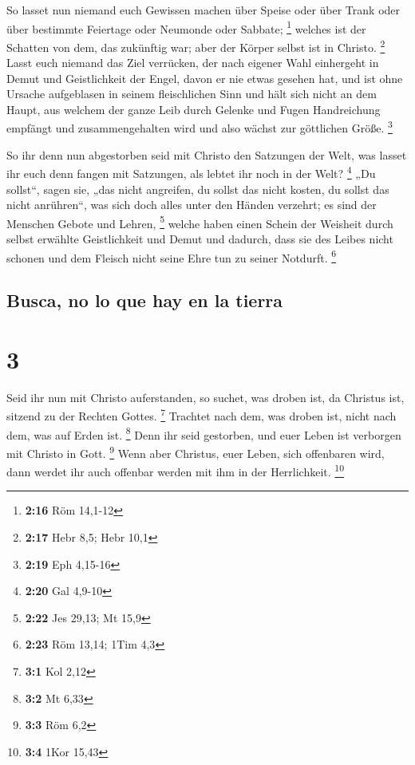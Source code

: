  So lasset nun niemand euch Gewissen machen über Speise
oder über Trank oder über bestimmte Feiertage oder Neumonde oder
Sabbate; \footnote{\textbf{2:16} Röm 14,1-12}  welches
ist der Schatten von dem, das zukünftig war; aber der Körper selbst ist
in Christo. \footnote{\textbf{2:17} Hebr 8,5; Hebr 10,1} 
Lasst euch niemand das Ziel verrücken, der nach eigener Wahl einhergeht
in Demut und Geistlichkeit der Engel, davon er nie etwas gesehen hat,
und ist ohne Ursache aufgeblasen in seinem fleischlichen Sinn
 und hält sich nicht an dem Haupt, aus welchem der ganze
Leib durch Gelenke und Fugen Handreichung empfängt und zusammengehalten
wird und also wächst zur göttlichen Größe. \footnote{\textbf{2:19} Eph
  4,15-16}

 So ihr denn nun abgestorben seid mit Christo den
Satzungen der Welt, was lasset ihr euch denn fangen mit Satzungen, als
lebtet ihr noch in der Welt? \footnote{\textbf{2:20} Gal 4,9-10}
 „Du sollst``, sagen sie, „das nicht angreifen, du sollst
das nicht kosten, du sollst das nicht anrühren``,  was
sich doch alles unter den Händen verzehrt; es sind der Menschen Gebote
und Lehren, \footnote{\textbf{2:22} Jes 29,13; Mt 15,9} 
welche haben einen Schein der Weisheit durch selbst erwählte
Geistlichkeit und Demut und dadurch, dass sie des Leibes nicht schonen
und dem Fleisch nicht seine Ehre tun zu seiner Notdurft. \footnote{\textbf{2:23}
  Röm 13,14; 1Tim 4,3}

\hypertarget{busca-no-lo-que-hay-en-la-tierra}{%
\subsection{Busca, no lo que hay en la
tierra}\label{busca-no-lo-que-hay-en-la-tierra}}

\hypertarget{section-2}{%
\section{3}\label{section-2}}

 Seid ihr nun mit Christo auferstanden, so suchet, was
droben ist, da Christus ist, sitzend zu der Rechten Gottes. \footnote{\textbf{3:1}
  Kol 2,12}  Trachtet nach dem, was droben ist, nicht nach
dem, was auf Erden ist. \footnote{\textbf{3:2} Mt 6,33} 
Denn ihr seid gestorben, und euer Leben ist verborgen mit Christo in
Gott. \footnote{\textbf{3:3} Röm 6,2}  Wenn aber Christus,
euer Leben, sich offenbaren wird, dann werdet ihr auch offenbar werden
mit ihm in der Herrlichkeit. \footnote{\textbf{3:4} 1Kor 15,43}

